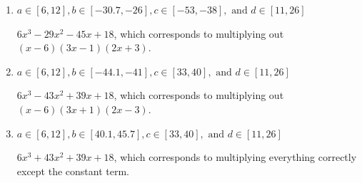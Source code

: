 \documentclass{extbook}[14pt]
\begin{document}
\begin{enumerate}
{\begin{enumerate}[label=\Alph*.]
* $6x^{3} +43 x^{2} +39 x -18$, which is the correct option.
\item \( a \in [6, 12], b \in [-30.7, -26], c \in [-53, -38], \text{ and } d \in [11, 26] \)

$6x^{3} -29 x^{2} -45 x + 18$, which corresponds to multiplying out $(x -6)(3x -1)(2x + 3)$.
\item \( a \in [6, 12], b \in [-44.1, -41], c \in [33, 40], \text{ and } d \in [11, 26] \)

$6x^{3} -43 x^{2} +39 x + 18$, which corresponds to multiplying out $(x -6)(3x + 1)(2x -3)$.
\item \( a \in [6, 12], b \in [40.1, 45.7], c \in [33, 40], \text{ and } d \in [11, 26] \)

$6x^{3} +43 x^{2} +39 x + 18$, which corresponds to multiplying everything correctly except the constant term.
\end{enumerate}

}
\end{enumerate}
\end{document}
